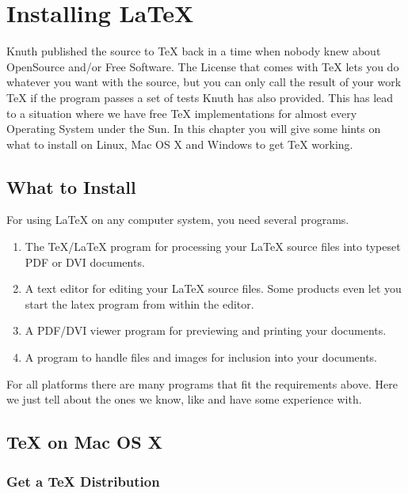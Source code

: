 \appendix
\chapter{Installing \LaTeX}
\begin{intro}
Knuth published the source to \TeX{} back in a time when nobody knew
about OpenSource and/or Free Software. The License that comes with \TeX{}
lets you do whatever you want with the source, but you can only call the
result of your work \TeX{} if the program passes a set of tests Knuth has
also provided. This has lead to a situation where we have free \TeX{}
implementations for almost every Operating System under the Sun. In this chapter
you will give some hints on what to install on Linux, Mac OS X and Windows to
get \TeX{} working.
\end{intro}

\section{What to Install}

For using LaTeX on any computer system, you need several programs.

\begin{enumerate}

\item The \TeX{}/\LaTeX{} program for processing your \LaTeX{} source files
into typeset PDF or DVI documents.

\item A text editor for editing your LaTeX source files. Some products even let
you start the latex program from within the editor.

\item A PDF/DVI viewer program for previewing and printing your
documents.

\item A program to handle \PSi{} files and images for inclusion into
your documents.

\end{enumerate}

For all platforms there are many programs that fit the requirements above.
Here we just tell about the ones we know, like and have some experience
with.

\section{\TeX{} on Mac OS X}

\subsection{Get a \TeX{} Distribution}

